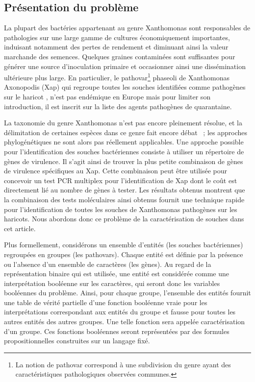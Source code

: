 \subsection{Présentation du problème}
La plupart des bactéries appartenant au genre Xanthomonas sont responsables de pathologies sur une large gamme de cultures économiquement importantes,  induisant notamment  des pertes de rendement et diminuant ainsi la valeur marchande des semences. Quelques graines contaminées sont suffisantes pour générer une source d'inoculation primaire et occasionner ainsi une dissémination ultérieure plus large. En particulier, le pathovar\footnote{La notion de pathovar correspond à une subdivision du genre ayant des caractéristiques pathologiques observées communes.} phaseoli de  Xanthomonas Axonopodis (Xap) qui regroupe toutes les souches identifiées comme pathogènes sur le haricot \cite{Vauterin1995}, n'est pas endémique en Europe mais pour limiter son introduction, il est inscrit sur la liste des agents pathogènes de quarantaine.

La taxonomie du genre Xanthomonas n'est pas encore pleinement résolue, et la délimitation de certaines espèces dans ce genre fait encore débat \cite{Schaad2005}~; les approches phylogénétiques ne sont alors pas réellement applicables. Une approche possible pour l'identification des souches bactériennes consiste à utiliser un répertoire de gènes de virulence. Il s'agit ainsi de trouver la plus petite combinaison de gènes de virulence spécifiques au Xap. Cette combinaison peut être utilisée pour concevoir un test PCR multiplex pour l'identification de Xap \cite{Boureau2013,Boureau2012} dont le coût est directement lié au nombre de gènes à tester. Les résultats obtenus
montrent que la combinaison des tests moléculaires ainsi obtenus fournit une technique rapide pour l'identification de toutes les souches de Xanthomonas pathogènes sur les haricots. Nous abordons donc ce problème de la caractérisation de souches dans cet article.

Plus formellement, considérons un ensemble d'entités (les souches bactériennes) regroupées en groupes (les pathovars). Chaque entité est définie par la présence ou l'absence d'un ensemble de caractères (les gènes). Au regard de la représentation binaire qui est utilisée, une entité est considérée comme une interprétation booléenne sur les caractères, qui seront donc les variables booléennes du problème. Ainsi, pour chaque groupe, l'ensemble des entités fournit une table de vérité partielle d'une fonction booléenne vraie pour les interprétations correspondant aux entités du groupe et fausse pour toutes les autres entités des autres groupes. Une telle fonction sera appelée caractérisation d'un groupe. Ces fonctions booléennes seront représentées par des formules propositionnelles construites sur un langage fixé.



